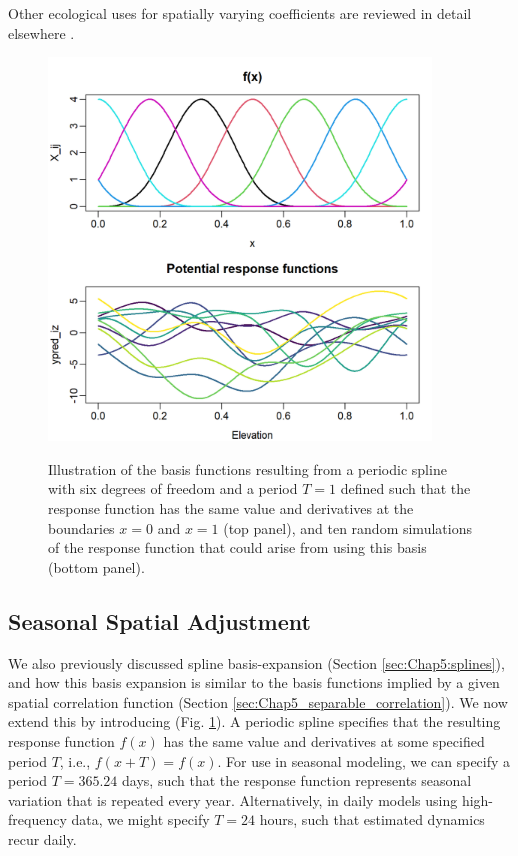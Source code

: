 Other ecological uses for spatially varying coefficients are reviewed in detail elsewhere \cite{thorson_spatially_2023}.

\begin{figure}[!ht]
    \caption[Periodic spline basis functions]{Illustration of the basis functions resulting from a periodic spline with six degrees of freedom and a period \(T=1\) defined such that the response function has the same value and derivatives at the boundaries \(x=0\) and \(x=1\) (top panel), and ten random simulations of the response function that could arise from using this basis (bottom panel).}
    \centering
    \includegraphics[width=4in]{Chap_6/Basis-cyclic.png}
    \label{fig:Chap8_Basis_cyclic}
\end{figure}

\subsection{Seasonal Spatial Adjustment}

We also previously discussed spline basis-expansion (Section \ref{sec:Chap5:splines}), and how this basis expansion is similar to the basis functions implied by a given spatial correlation function (Section \ref{sec:Chap5_separable_correlation}).  We now extend this by introducing  (Fig. \ref{fig:Chap8_Basis_cyclic}). A periodic spline specifies that the resulting response function \(f(x)\) has the same value and derivatives at some specified period \(T\), i.e., \( f(x+T) = f(x) \).  For use in seasonal modeling, we can specify a period \( T = 365.24 \) days, such that the response function represents seasonal variation that is repeated every year.  Alternatively, in daily models using high-frequency data, we might specify \( T = 24 \) hours, such that estimated dynamics recur daily. 

